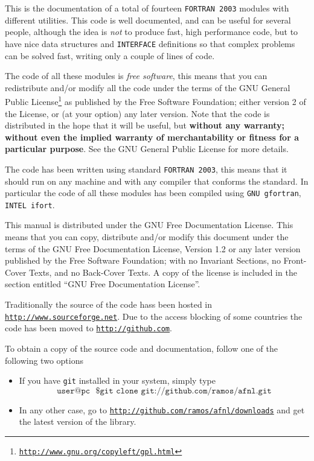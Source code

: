 
This is the documentation of a total of fourteen \texttt{FORTRAN 2003}
modules with different utilities. This code is well documented, and
can be useful for several people, although the idea is \emph{not} to
produce fast, high performance code, but to have nice data structures
and \texttt{INTERFACE} definitions so that complex problems can be
solved fast, writing only a couple of lines of code. 

The code of all these modules is \emph{free software}, this means that
you can redistribute and/or modify all the code under the terms of the
GNU General Public
License\footnote{\href{http://www.gnu.org/copyleft/gpl.html}{\texttt{http://www.gnu.org/copyleft/gpl.html}}} 
as published by the Free Software Foundation; either version 2
of the License, or (at your option) any later version. Note that the
code is distributed in the hope that it will be useful, but
\textbf{without any warranty; without even the implied warranty of
  merchantability or fitness for a particular purpose}.  See the GNU
General Public License for more details. 

The code has been written using standard \texttt{FORTRAN 2003}, this
means that it should run on any machine and with any compiler that
conforms the standard. In
particular the code of all these modules has been compiled using
\texttt{GNU gfortran}, \texttt{INTEL ifort}.

This manual is distributed under the GNU Free Documentation
License. This means that you can copy, distribute and/or modify this
document under the terms of the GNU Free Documentation License,
Version 1.2 or any later version published by the Free Software
Foundation; with no Invariant Sections, no Front-Cover Texts, and no
Back-Cover Texts.  A copy of the license is included in the section
entitled ``GNU Free Documentation License''.

Traditionally the source of the code hass been hosted in
\href{sourceforge}{\texttt{http://www.sourceforge.net}}. Due to the access
blocking of some countries the code has been moved to
\href{http://github.com}{\texttt{http://github.com}}. 

To obtain a copy of the source code and documentation, follow one of
the following two options
\begin{itemize}
\item If you have \texttt{git} installed in your system, simply type
  \begin{displaymath}
    \texttt{user@pc~ \$ git clone git://github.com/ramos/afnl.git}
  \end{displaymath}
\item In any other case, go to
  \href{http://github.com/ramos/afnl/downloads}{\texttt{http://github.com/ramos/afnl/downloads}}
  and get the latest version of the library. 
\end{itemize}

